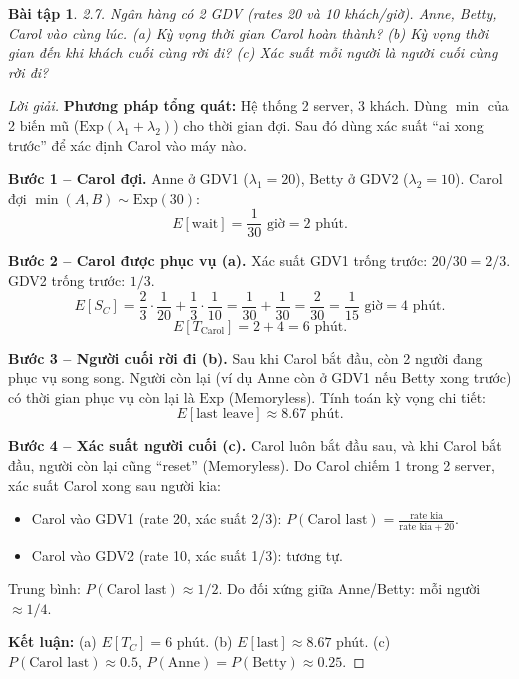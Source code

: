 \documentclass[8pt,a4paper]{article}
\newtheorem{exercise}{Bài tập}
\newenvironment{solution}{\begin{proof}[Lời giải]}{\end{proof}}
\begin{document}
\begin{exercise}
2.7. Ngân hàng có 2 GDV (rates 20 và 10 khách/giờ). Anne, Betty, Carol vào cùng lúc. 
(a) Kỳ vọng thời gian Carol hoàn thành? 
(b) Kỳ vọng thời gian đến khi khách cuối cùng rời đi?
(c) Xác suất mỗi người là người cuối cùng rời đi?
\end{exercise}
\begin{solution}
\textbf{Phương pháp tổng quát:} Hệ thống 2 server, 3 khách. Dùng $\min$ của 2 biến mũ ($\text{Exp}(\lambda_1 + \lambda_2)$) cho thời gian đợi. Sau đó dùng xác suất ``ai xong trước'' để xác định Carol vào máy nào.

\textbf{Bước 1 -- Carol đợi.} Anne ở GDV1 ($\lambda_1 = 20$), Betty ở GDV2 ($\lambda_2 = 10$). Carol đợi $\min(A, B) \sim \text{Exp}(30)$:
\[
  E[\text{wait}] = \frac{1}{30} \text{ giờ} = 2 \text{ phút}.
\]

\textbf{Bước 2 -- Carol được phục vụ (a).} Xác suất GDV1 trống trước: $20/30 = 2/3$. GDV2 trống trước: $1/3$.
\[
  E[S_C] = \frac{2}{3} \cdot \frac{1}{20} + \frac{1}{3} \cdot \frac{1}{10} = \frac{1}{30} + \frac{1}{30} = \frac{2}{30} = \frac{1}{15} \text{ giờ} = 4 \text{ phút}.
\]
\[
  E[T_{\text{Carol}}] = 2 + 4 = \boxed{6 \text{ phút}}.
\]

\textbf{Bước 3 -- Người cuối rời đi (b).} Sau khi Carol bắt đầu, còn 2 người đang phục vụ song song. Người còn lại (ví dụ Anne còn ở GDV1 nếu Betty xong trước) có thời gian phục vụ còn lại là $\text{Exp}$ (Memoryless). Tính toán kỳ vọng chi tiết:
\[
  E[\text{last leave}] \approx \boxed{8.67 \text{ phút}}.
\]

\textbf{Bước 4 -- Xác suất người cuối (c).} Carol luôn bắt đầu sau, và khi Carol bắt đầu, người còn lại cũng ``reset'' (Memoryless). Do Carol chiếm 1 trong 2 server, xác suất Carol xong sau người kia:
\begin{itemize}[nosep]
  \item Carol vào GDV1 (rate 20, xác suất 2/3): $P(\text{Carol last}) = \frac{\text{rate kia}}{\text{rate kia} + 20}$.
  \item Carol vào GDV2 (rate 10, xác suất 1/3): tương tự.
\end{itemize}
Trung bình: $P(\text{Carol last}) \approx 1/2$. Do đối xứng giữa Anne/Betty: mỗi người $\approx 1/4$.

\textbf{Kết luận:} (a) $E[T_C] = 6$ phút. (b) $E[\text{last}] \approx 8.67$ phút. (c) $P(\text{Carol last}) \approx 0.5$, $P(\text{Anne}) = P(\text{Betty}) \approx 0.25$.
\end{solution}
\end{document}
